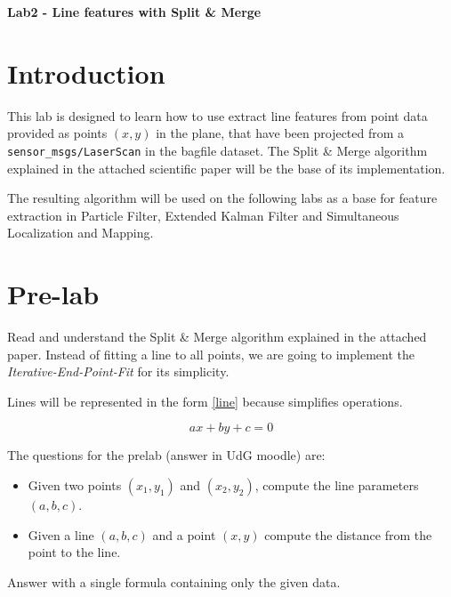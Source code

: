 \documentclass[a4paper,10pt]{article}
\begin{document}
\marginsize{2cm}{2cm}{2cm}{2cm}

\begin{center}
\Large \textbf{Lab2 - Line features with Split \& Merge}
\end{center}

\section{Introduction}

This lab is designed to learn how to use extract line features from point data provided as points $(x,y)$ in the plane, that have been projected from a \texttt{sensor\_msgs/LaserScan} in the bagfile dataset. The Split \& Merge algorithm explained in the attached scientific paper will be the base of its implementation.

The resulting algorithm will be used on the following labs as a base for feature extraction in Particle Filter, Extended Kalman Filter and Simultaneous Localization and Mapping. 

\section{Pre-lab}

Read and understand the Split \& Merge algorithm explained in the attached paper. Instead of fitting a line to all points, we are going to implement the \emph{Iterative-End-Point-Fit} for its simplicity.

Lines will be represented in the form \eqref{line} because simplifies operations.

\begin{equation}
    a x + b y + c = 0 \label{line}
\end{equation}

\noindent
The questions for the prelab (answer in UdG moodle) are:

\begin{itemize}
    \item Given two points $(x_1, y_1)$ and $(x_2, y_2)$, compute the line parameters $(a,b,c)$.
    \item Given a line $(a,b,c)$ and a point $(x,y)$ compute the distance from the point to the line.
\end{itemize}

\noindent
Answer with a single formula containing only the given data.
\end{document}
